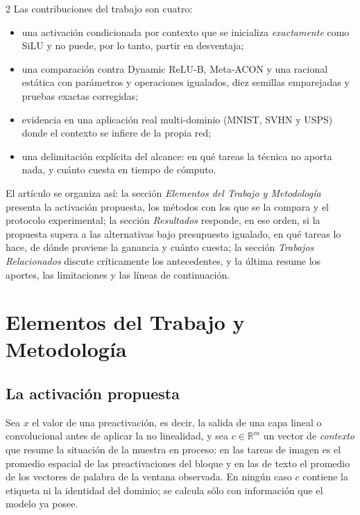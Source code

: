 \begin{multicols}{2}
Las contribuciones del trabajo son cuatro:

\begin{itemize}[leftmargin=1.1em,itemsep=0.15em,topsep=0.25em]
\item una activación condicionada por contexto que se inicializa \textit{exactamente} como SiLU y no puede, por lo tanto, partir en desventaja;
\item una comparación contra Dynamic ReLU-B, Meta-ACON y una racional estática con parámetros y operaciones igualados, diez semillas emparejadas y pruebas exactas corregidas;
\item evidencia en una aplicación real multi-dominio (MNIST, SVHN y USPS) donde el contexto se infiere de la propia red;
\item una delimitación explícita del alcance: en qué tareas la técnica no aporta nada, y cuánto cuesta en tiempo de cómputo.
\end{itemize}

El artículo se organiza así: la sección \textit{Elementos del Trabajo y Metodología} presenta la activación propuesta, los métodos con los que se la compara y el protocolo experimental; la sección \textit{Resultados} responde, en ese orden, si la propuesta supera a las alternativas bajo presupuesto igualado, en qué tareas lo hace, de dónde proviene la ganancia y cuánto cuesta; la sección \textit{Trabajos Relacionados} discute críticamente los antecedentes, y la última resume los aportes, las limitaciones y las líneas de continuación.

\section{Elementos del Trabajo y Metodología}

\subsection{La activación propuesta}

Sea $x$ el valor de una preactivación, es decir, la salida de una capa lineal o convolucional antes de aplicar la no linealidad, y sea $c\in\mathbb{R}^{m}$ un vector de \textit{contexto} que resume la situación de la muestra en proceso: en las tareas de imagen es el promedio espacial de las preactivaciones del bloque y en las de texto el promedio de los vectores de palabra de la ventana observada. En ningún caso $c$ contiene la etiqueta ni la identidad del dominio; se calcula sólo con información que el modelo ya posee.


\end{multicols}
